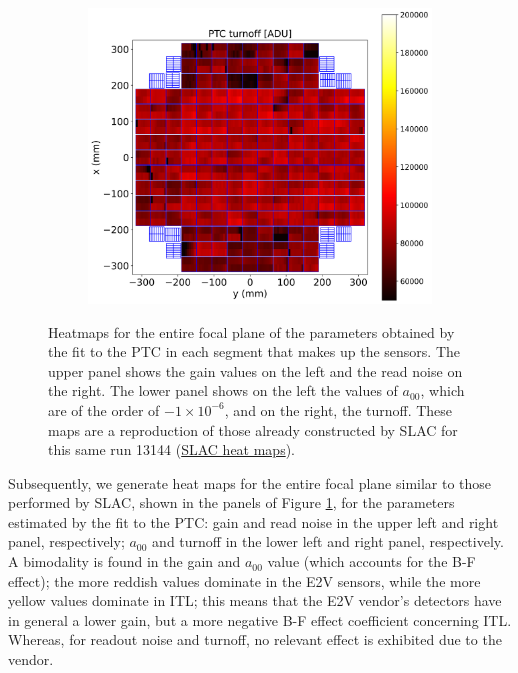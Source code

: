 \begin{figure}[!htb]
\begin{subfigure}[b]{0.49\textwidth}
     \end{subfigure}    
     \hfill
     \begin{subfigure}[b]{0.49\textwidth}
         \centering
         \includegraphics[width=\textwidth]{Figures/Focal_plane_turnoff.png}
     \end{subfigure}
        \caption{Heatmaps for the entire focal plane of the parameters obtained by the fit to the PTC in each segment that makes up the sensors. The upper panel shows the gain values on the left and the read noise on the right. The lower panel shows on the left the values of $a_{00}$, which are of the order of $-1 \times 10 ^{-6}$, and on the right, the turnoff. These maps are a reproduction of those already constructed by SLAC for this same run 13144 (\href{https://srs.slac.stanford.edu/BOT_EO_Reports/13144/}{SLAC heat maps}).}
        \label{fig:FocalPlane_PTC}
\end{figure}

Subsequently, we generate heat maps for the entire focal plane similar to those performed by SLAC, shown in the panels of Figure \ref{fig:FocalPlane_PTC}, for the parameters estimated by the fit to the PTC: gain and read noise in the upper left and right panel, respectively; $a_{00}$ and turnoff in the lower left and right panel, respectively. A bimodality is found in the gain and $a_{00}$ value (which accounts for the B-F effect); the more reddish values dominate in the E2V sensors, while the more yellow values dominate in ITL; this means that the E2V vendor's detectors have in general a lower gain, but a more negative B-F effect coefficient concerning ITL. Whereas, for readout noise and turnoff, no relevant effect is exhibited due to the vendor. 

